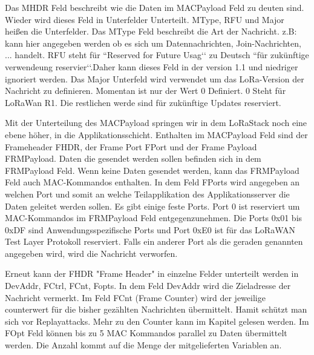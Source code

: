 \documentclass[a4paper,12pt]{article}
\begin{document}
                Das MHDR Feld beschreibt wie die Daten im MACPayload Feld zu deuten sind. Wieder wird dieses Feld in 
                Unterfelder Unterteilt. MType, RFU und Major heißen die Unterfelder. Das MType Feld beschreibt die Art der 
                Nachricht. z.B: kann hier angegeben werden ob es sich um Datennachrichten, Join-Nachrichten, ... handelt. 
                RFU steht für ``Reserved for Future Usag‘‘ zu Deutsch ``für zukünftige verwendeung reservier‘‘.Daher kann 
                dieses Feld in der version 1.1 und niedriger ignoriert werden. Das Major Unterfeld wird verwendet um das 
                LoRa-Version der Nachricht zu definieren. Momentan ist nur der Wert 0 Definiert. 0 Steht für LoRaWan R1. 
                Die restlichen werde sind für zukünftige Updates reserviert.

                Mit der Unterteilung des MACPayload springen wir in dem LoRaStack noch eine ebene höher, in die 
                Applikationsschicht. Enthalten im MACPayload Feld sind der Frameheader FHDR, der Frame Port FPort und der 
                Frame Payload FRMPayload. Daten die gesendet werden sollen befinden sich in dem FRMPayload Feld. Wenn keine
                Daten gesendet werden, kann das FRMPayload Feld auch MAC-Kommandos enthalten. In dem Feld FPorts wird 
                angegeben an welchen Port und somit an welche Teilapplikation des Applikationsserver die Daten geleitet 
                werden sollen. Es gibt einige feste Ports. Port 0 ist reserviert um MAC-Kommandos im FRMPayload Feld 
                entgegenzunehmen. Die Ports 0x01 bis 0xDF sind Anwendungsspezifische Ports und Port 0xE0 ist für das 
                LoRaWAN Test Layer Protokoll reserviert. Falls ein anderer Port als die geraden genannten angegeben wird, 
                wird die Nachricht verworfen. 

                Erneut kann der FHDR "Frame Header" in einzelne Felder unterteilt werden in DevAddr, FCtrl, FCnt, Fopts. 
                In dem Feld DevAddr wird die Zieladresse der Nachricht vermerkt. Im Feld FCnt (Frame Counter) wird der 
                jeweilige counterwert für die bisher gezählten Nachrichten übermittelt. Hamit schützt man sich vor 
                Replayattacks. Mehr zu den Counter kann im Kapitel  gelesen werden. Im FOpt Feld 
                können bis zu 5 MAC Kommandos parallel zu Daten übermittelt werden. Die Anzahl kommt auf die Menge der 
                mitgelieferten Variablen an. 
\end{document}
